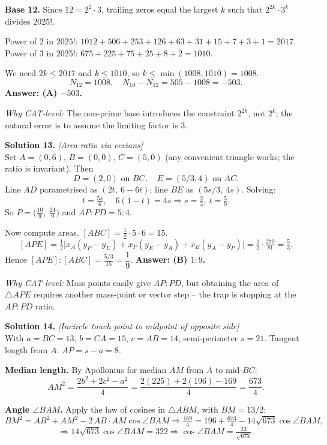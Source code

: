 \documentclass[11pt,a4paper]{article}
\begin{document}
\textbf{Base 12.} Since $12 = 2^{2}\!\cdot\!3$, trailing zeros equal the largest $k$ such that $2^{2k} \cdot 3^{k}$ divides $2025!$.

Power of $2$ in $2025!$: $1012 + 506 + 253 + 126 + 63 + 31 + 15 + 7 + 3 + 1 = 2017$.\\
Power of $3$ in $2025!$: $675 + 225 + 75 + 25 + 8 + 2 = 1010$.

We need $2k \le 2017$ and $k \le 1010$, so $k \le \min(1008, 1010) = 1008$.
\[
N_{12} = 1008, \quad N_{10} - N_{12} = 505 - 1008 = -503.
\]
\textbf{Answer: (A) $-503$.}

\textit{Why CAT-level:} The non-prime base introduces the constraint $2^{2k}$, not $2^{k}$; the natural error is to assume the limiting factor is $3$.

\vspace{4pt}
\textbf{Solution 13.} \textit{[Area ratio via cevians]}\\
Set $A = (0, 6)$, $B = (0, 0)$, $C = (5, 0)$ (any convenient triangle works; the ratio is invariant). Then
\[
D = (2, 0) \text{ on } BC,\quad E = (5/3, 4) \text{ on } AC.
\]
Line $AD$ parametrised as $(2t,\ 6-6t)$; line $BE$ as $(5s/3,\ 4s)$. Solving:
\[
t = \tfrac{5s}{6},\quad 6(1-t) = 4s \Rightarrow s = \tfrac{2}{3},\ t = \tfrac{5}{9}.
\]
So $P = \big(\tfrac{10}{9},\ \tfrac{24}{9}\big)$ and $AP : PD = 5 : 4$.

Now compute areas. $[ABC] = \tfrac{1}{2}\cdot 5\cdot 6 = 15$.
\[
[APE] = \tfrac{1}{2}\Big| x_A(y_P - y_E) + x_P(y_E - y_A) + x_E(y_A - y_P) \Big| = \tfrac{1}{2}\cdot\tfrac{270}{81} = \tfrac{5}{3}.
\]
Hence $[APE] : [ABC] = \tfrac{5/3}{15} = \dfrac{1}{9}$.
\textbf{Answer: (B) $1 : 9$.}

\textit{Why CAT-level:} Mass points easily give $AP : PD$, but obtaining the area of $\triangle APE$ requires another mass-point or vector step -- the trap is stopping at the $AP : PD$ ratio.

\vspace{4pt}
\textbf{Solution 14.} \textit{[Incircle touch point to midpoint of opposite side]}\\
With $a = BC = 13$, $b = CA = 15$, $c = AB = 14$, semi-perimeter $s = 21$. Tangent length from $A$: $AP = s - a = 8$.

\textbf{Median length.} By Apollonius for median $AM$ from $A$ to mid-$BC$:
\[
AM^{2} = \frac{2b^{2} + 2c^{2} - a^{2}}{4} = \frac{2(225) + 2(196) - 169}{4} = \frac{673}{4}.
\]

\textbf{Angle $\angle BAM$.} Apply the law of cosines in $\triangle ABM$, with $BM = 13/2$:
\[
BM^{2} = AB^{2} + AM^{2} - 2\,AB\cdot AM\cos\angle BAM
\Rightarrow \tfrac{169}{4} = 196 + \tfrac{673}{4} - 14\sqrt{673}\cos\angle BAM,
\]
\[
\Rightarrow 14\sqrt{673}\cos\angle BAM = 322 \Rightarrow \cos\angle BAM = \tfrac{23}{\sqrt{673}}.
\]
\end{document}
